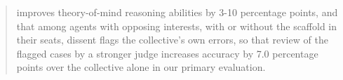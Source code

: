 \begin{abstract}
improves theory-of-mind reasoning abilities by 3-10 percentage points,
and that among agents with opposing interests, with or without the scaffold in their seats, dissent flags the collective's own errors, so that review of the flagged cases by a stronger judge increases accuracy by 7.0 percentage points over the collective alone in our primary evaluation.

\end{abstract}
